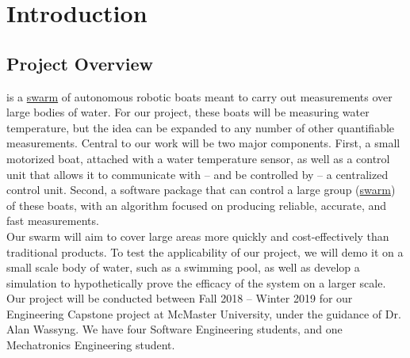 \documentclass[11pt]{article}
\begin{document}
\section{Introduction}

\subsection{Project Overview}

\PROJECTNAME \space is a \hyperref[sec:definitions]{swarm} of autonomous robotic boats meant to carry out measurements over large bodies of water. For our project, these boats will be measuring water temperature, but the idea can be expanded to any number of other quantifiable measurements. Central to our work will be two major components. First, a small motorized boat, attached with a water temperature sensor, as well as a control unit that allows it to communicate with – and be controlled by – a centralized control unit. Second, a software package that can control a large group (\hyperref[sec:definitions]{swarm}) of these boats, with an algorithm focused on producing reliable, accurate, and fast measurements.\\

Our swarm will aim to cover large areas more quickly and cost-effectively than traditional products. To test the applicability of our project, we will demo it on a small scale body of water, such as a swimming pool, as well as develop a simulation to hypothetically prove the efficacy of the system on a larger scale.\\

Our project will be conducted between Fall 2018 – Winter 2019 for our Engineering Capstone project at McMaster University, under the guidance of Dr. Alan Wassyng. We have four Software Engineering students, and one Mechatronics Engineering student.
\end{document}
